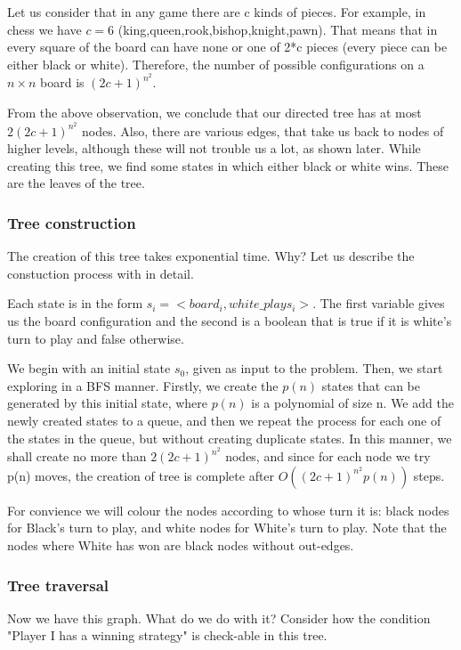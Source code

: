 Let us consider that in any game there are c kinds of pieces. For example, in chess we have $c=6$ (king,queen,rook,bishop,knight,pawn). That means that in 
every square of the board can have none or one of 2*c pieces (every piece can 
be either black or white).  Therefore, the number of possible 
configurations on a $n \times n$ board is $(2c+1)^{n^2}$. 


From the above observation, we conclude that our directed tree has at most $2(2c+1)^{n^2}$ nodes. Also, there are various edges,
that take us back to nodes of higher levels, although these will not trouble us a lot, as shown later. While 
creating this tree, we find some states in which either black or white 
wins. These are the leaves of the tree. 

\subsubsection*{Tree construction}
The creation of this tree takes exponential time. Why? Let us describe the 
constuction process with in detail.

Each state is in the form $s_i= <board_i, white\_plays_i>$. The first variable gives us the board configuration and 
the second is a boolean that is true if it is white's turn to play and false otherwise. 

We begin with an initial state $s_0$, given as input to the problem. Then, we start exploring in a BFS manner. Firstly, we 
create the $p(n)$ states that can be generated by this initial state, where $p(n)$ is a polynomial of size n. We add the newly
created states to a queue, and then we repeat the process for each one of the states in the queue, but without creating 
duplicate states. In this manner, we shall create no more than $2(2c+1)^{n^2}$ nodes, and since for each node we 
try p(n) moves, the creation of tree is complete after $O((2c+1)^{n^2}p(n))$ steps.

For convience we will colour the nodes according to whose turn it is: black nodes for Black's turn to play, and white nodes for White's turn to play. Note that
the nodes where White has won are black nodes without out-edges.

\subsubsection*{Tree traversal}
Now we have this graph. What do we do with it? Consider how the condition
"Player I has a winning strategy" is check-able in this tree.  

